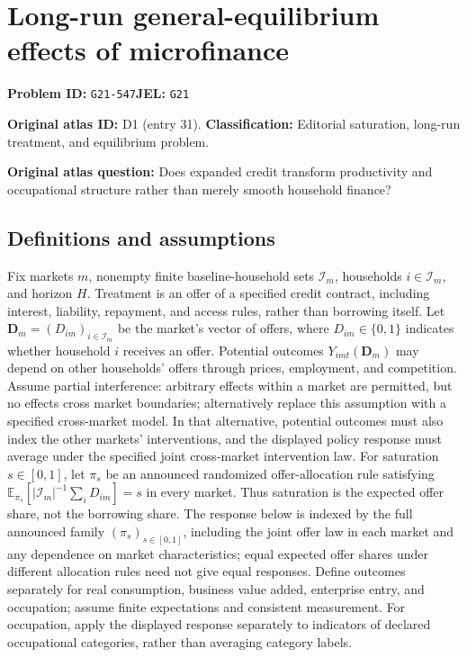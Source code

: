 \documentclass[11pt,a4paper]{article}
\begin{document}
\section*{Long-run general-equilibrium effects of microfinance}
\textbf{Problem ID:} \texttt{G21-547}\quad \textbf{JEL:} \texttt{G21}\par
\label{problem:OP-0031}
\label{atlas:prob:D1}
\noindent\textbf{Original atlas ID:} D1 (entry 31). \textbf{Classification:} Editorial saturation, long-run treatment, and equilibrium problem.

\noindent\textbf{Original atlas question:} Does expanded credit transform productivity and occupational structure rather than merely smooth household finance?

\subsection*{Definitions and assumptions}
Fix markets $m$, nonempty finite baseline-household sets $\mathcal I_m$, households $i\in\mathcal I_m$, and horizon $H$. Treatment is an offer of a specified credit contract, including interest, liability, repayment, and access rules, rather than borrowing itself. Let $\mathbf D_m=(D_{im})_{i\in\mathcal I_m}$ be the market's vector of offers, where $D_{im}\in\{0,1\}$ indicates whether household $i$ receives an offer. Potential outcomes $Y_{imt}(\mathbf D_m)$ may depend on other households' offers through prices, employment, and competition. Assume partial interference: arbitrary effects within a market are permitted, but no effects cross market boundaries; alternatively replace this assumption with a specified cross-market model. In that alternative, potential outcomes must also index the other markets' interventions, and the displayed policy response must average under the specified joint cross-market intervention law. For saturation $s\in[0,1]$, let $\pi_s$ be an announced randomized offer-allocation rule satisfying $\mathbb E_{\pi_s}[|\mathcal I_m|^{-1}\sum_i D_{im}]=s$ in every market. Thus saturation is the expected offer share, not the borrowing share. The response below is indexed by the full announced family $(\pi_s)_{s\in[0,1]}$, including the joint offer law in each market and any dependence on market characteristics; equal expected offer shares under different allocation rules need not give equal responses. Define outcomes separately for real consumption, business value added, enterprise entry, and occupation; assume finite expectations and consistent measurement. For occupation, apply the displayed response separately to indicators of declared occupational categories, rather than averaging category labels.
\end{document}
